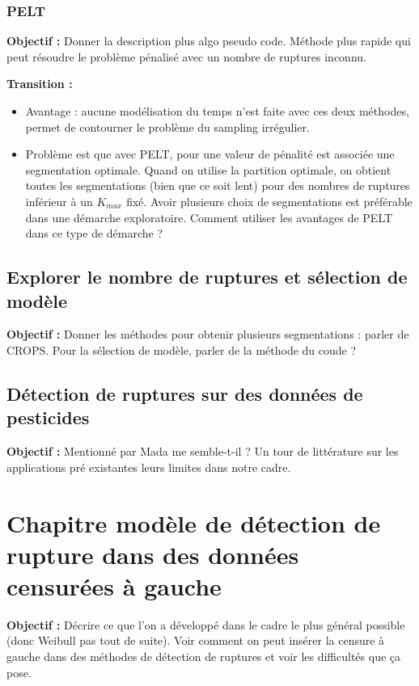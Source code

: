 \documentclass[12pt, twoside]{report}
\begin{document}
\subsection{PELT}

\textbf{Objectif :} Donner la description plus algo pseudo code. Méthode plus rapide qui peut résoudre le problème pénalisé avec un nombre de ruptures inconnu. 

\textbf{Transition :} 
\begin{itemize}
\item Avantage : aucune modélisation du temps n'est faite avec ces deux méthodes, permet de contourner le problème du sampling irrégulier. 
\item Problème est que avec PELT, pour une valeur de pénalité est associée une segmentation optimale. Quand on utilise la partition optimale, on obtient toutes les segmentations (bien que ce soit lent) pour des nombres de ruptures inférieur à un $K_{max}$ fixé. Avoir plusieurs choix de segmentations est préférable dans une démarche exploratoire. Comment utiliser les avantages de PELT dans ce type de démarche ?
\end{itemize}

\section{Explorer le nombre de ruptures et sélection de modèle}

\textbf{Objectif :} Donner les méthodes pour obtenir plusieurs segmentations : parler de CROPS. Pour la sélection de modèle, parler de la méthode du coude ?

\section{Détection de ruptures sur des données de pesticides}

\textbf{Objectif :} Mentionné par Mada me semble-t-il ? Un tour de littérature sur les applications pré existantes leurs limites dans notre cadre.

\chapter{Chapitre modèle de détection de rupture dans des données censurées à gauche}

\textbf{Objectif :} Décrire ce que l'on a développé dans le cadre le plus général possible (donc Weibull pas tout de suite). Voir comment on peut insérer la censure à gauche dans des méthodes de détection de ruptures et voir les difficultés que ça pose.
\end{document}
